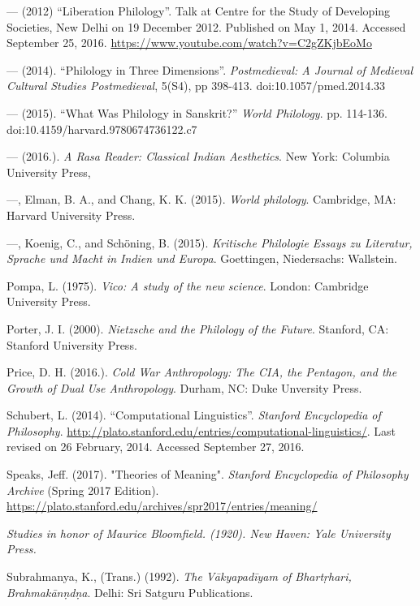 \begin{thebibliography}{99}
  — (2012) “Liberation Philology”. Talk at Centre for the Study of Developing Societies, New Delhi on 19 December 2012. Published on May 1, 2014. Accessed September 25, 2016. \url{https://www.youtube.com/watch?v=C2gZKjbEoMo}

  — (2014). “Philology in Three Dimensions”. \textit{Postmedieval: A Journal of Medieval Cultural Studies Postmedieval}, 5(S4), pp 398-413. doi:10.1057/pmed.2014.33

  — (2015). “What Was Philology in Sanskrit?” \textit{World Philology}. pp. 114-136. doi:10.4159/harvard.9780674736122.c7

  — (2016.). \textit{A Rasa Reader: Classical Indian Aesthetics}. New York: Columbia University Press,

  —, Elman, B. A., and Chang, K. K. (2015). \textit{World philology}. Cambridge, MA: Harvard University Press.

  —, Koenig, C., and Schöning, B. (2015). \textit{Kritische Philologie Essays zu Literatur, Sprache und Macht in Indien und Europa}. Goettingen, Niedersachs: Wallstein.

  Pompa, L. (1975). \textit{Vico: A study of the new science}. London: Cambridge University Press.

  Porter, J. I. (2000). \textit{Nietzsche and the Philology of the Future}. Stanford, CA: Stanford University Press.

  Price, D. H. (2016.). \textit{Cold War Anthropology: The CIA, the Pentagon, and the Growth of Dual Use Anthropology}. Durham, NC: Duke Unversity Press.

  Schubert, L. (2014). “Computational Linguistics”. \textit{Stanford Encyclopedia of Philosophy}. \url{http://plato.stanford.edu/entries/computational-linguistics/}. Last revised on 26 February, 2014. Accessed September 27, 2016.

  Speaks, Jeff. (2017). "Theories of Meaning". \textit{Stanford Encyclopedia of Philosophy Archive} (Spring 2017 Edition). \url{https://plato.stanford.edu/archives/spr2017/entries/meaning/}

  \textit{Studies in honor of Maurice Bloomfield. (1920). New Haven: Yale University Press.}

  Subrahmanya, K., (Trans.) (1992). \textit{The Vākyapadīyam of Bhartṛhari, Brahmakānṇdṇa}. Delhi: Sri Satguru Publications.


\end{thebibliography}

